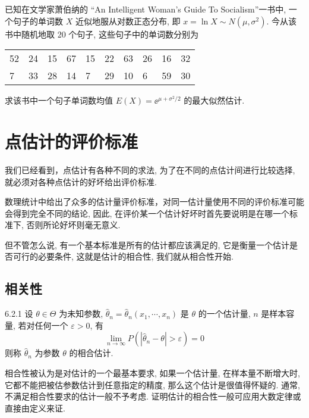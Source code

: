 \begin{xiti}
\item 已知在文学家萧伯纳的 “An Intelligent Woman's Guide To Socialism”一书中, 一个句子的单词数 $X$ 近似地服从对数正态分布, 即 $x=\ln X\sim N(\mu,\sigma^2)$. 今从该书中随机地取 20 个句子, 这些句子中的单词数分别为
\begin{center}
\begin{tabularx}{0.8\textwidth}{*{10}{Z}}
52 & 24 & 15 & 67 & 15 & 22 & 63 & 26 & 16 & 32\\
7 & 33 & 28 & 14 & 7 & 29 & 10 & 6 & 59 & 30
\end{tabularx}	
\end{center}
求该书中一个句子单词数均值 $E(X)=\ee^{\mu+\sigma^2/2}$ 的最大似然估计.
\end{xiti}

\section{点估计的评价标准}\label{sec:6.2}

我们已经看到，点估计有各种不同的求法, 为了在不同的点估计间进行比较选择, 就必须对各种点估计的好坏给出评价标准.

数理统计中给出了众多的估计量评价标准，对同一估计量使用不同的评价标准可能会得到完全不同的结论, 因此, 在评价某一个估计好坏时首先要说明是在哪一个标准下, 否则所论好坏则毫无意义.

但不管怎么说, 有一个基本标准是所有的估计都应该满足的, 它是衡量一个估计是否可行的必要条件, 这就是估计的相合性, 我们就从相合性开始.

\subsection{相关性}\label{ssec:6.2.1} %

\begin{definition}{}{6.2.1}
设 $\theta\in\Theta$ 为未知参数, $\hat{\theta}_n=\hat{\theta}_n(x_1,\cdots,x_n)$ 是 $\theta$ 的一个估计量, $n$ 是样本容量, 若对任何一个 $\varepsilon>0$, 有
\begin{equation}\label{eq:6.2.1}
\lim _{n \rightarrow \infty} P(|\hat{\theta}_{n}-\theta|>\varepsilon)=0
\end{equation}
则称 $\hat{\theta}_n$ 为参数 $\theta$ 的相合估计.
\end{definition}
相合性被认为是对估计的一个最基本要求, 如果一个估计量, 在样本量不断增大时, 它都不能把被估参数估计到任意指定的精度, 那么这个估计是很值得怀疑的. 通常, 不满足相合性要求的估计一般不予考虑. 证明估计的相合性一般可应用大数定律或直接由定义来证.

